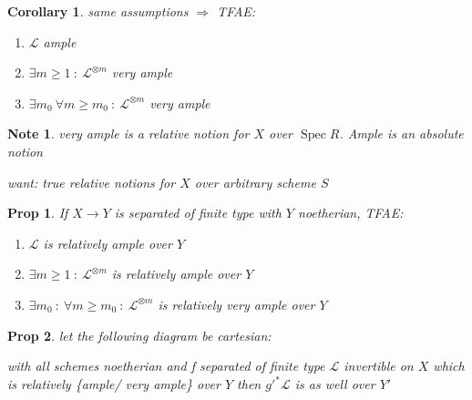 \documentclass[a4paper, 12pt]{article}
\newcommand{\ca}[1]{\mathcal{#1}}
\newcommand{\cl}{\mathcal{L}}
\newtheorem*{prop}{Prop}
\newtheorem*{note}{Note}
\newtheorem*{cor}{Corollary}
\DeclareMathOperator{\spec}{Spec}
\begin{document}
	\begin{cor}
		same assumptions $ \Rightarrow $ TFAE:
		
		\begin{enumerate}
			\item $ \ca{L} $ ample
			\item $ \exists m \geq 1 \: :\: \ca{L}^{\otimes m} $ very ample
			\item $ \exists m_0 \: \forall m \geq m_0 \: : \: \ca{L}^{\otimes m} $ very ample
		\end{enumerate}
	\end{cor}
	
	\begin{note}
		very ample is a relative notion for $ X $ over $ \spec R $. Ample is an absolute notion
		
		want: true relative notions for $ X $ over arbitrary scheme $ S $
	\end{note}
	
	\begin{prop}
		If $ X \rightarrow Y $ is separated of finite type with $ Y $ noetherian, TFAE:
		
		\begin{enumerate}
			\item $ \cl  $ is relatively ample over $ Y $
			\item $ \exists m \geq 1 \: : \: \cl^{\otimes m} $ is relatively ample over $ Y $
			\item $ \exists m_0 \: :\: \forall m \geq m_0 \: : \: \cl^{\otimes m} $ is relatively very ample over $ Y $
		\end{enumerate}
				
	\end{prop}
	
	\begin{prop}
		 let the following diagram be cartesian:
		 
		 
		 with all schemes noetherian and f separated of finite type $ \cl $ invertible on $ X $ which is relatively \{ample/ very ample\} over $ Y $
		 then $ g'^*\cl $ is as well over $ Y' $ 
		 
	\end{prop}
	
\end{document}
